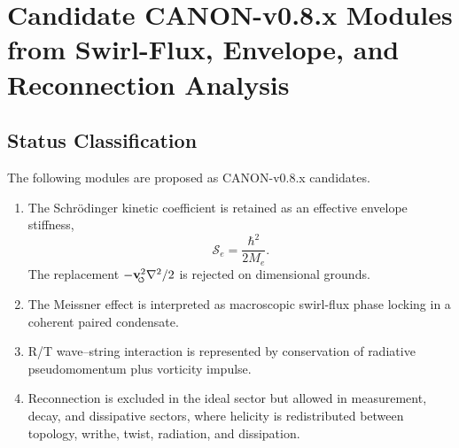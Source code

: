 
\section{Candidate CANON-v0.8.x Modules from Swirl-Flux, Envelope, and Reconnection Analysis}
    \label{app:sst_v08_candidate_modules}

    \providecommand{\swirlarrow}{%
        \mathchoice{\mkern-2mu\scriptstyle\boldsymbol{\circlearrowleft}}%
        {\mkern-2mu\scriptstyle\boldsymbol{\circlearrowleft}}%
        {\mkern-2mu\scriptscriptstyle\boldsymbol{\circlearrowleft}}%
        {\mkern-2mu\scriptscriptstyle\boldsymbol{\circlearrowleft}}%
    }
    \providecommand{\vswirl}{\mathbf{v}_{\!\swirlarrow}}
    \providecommand{\rhoF}{\rho_{\!f}}
    \providecommand{\rhoE}{\rho_{\!E}}
    \providecommand{\rhoM}{\rho_{\!m}}
    \providecommand{\rhocore}{\rho_{\mathrm{core}}}
    \providecommand{\rc}{r_c}
    \providecommand{\Fswirlmax}{F_{\mathrm{swirl}}^{\max}}
    
    \subsection{Status Classification}
        
        The following modules are proposed as CANON-v0.8.x candidates.
        
        \begin{enumerate}
            \item The Schrödinger kinetic coefficient is retained as an effective
            envelope stiffness,
            \[
                \mathcal S_e=\frac{\hbar^2}{2M_e}.
            \]
            The replacement \(-\vswirl^2\nabla^2/2\) is rejected on dimensional grounds.
            
            \item The Meissner effect is interpreted as macroscopic swirl-flux phase
            locking in a coherent paired condensate.
            
            \item R/T wave--string interaction is represented by conservation of
            radiative pseudomomentum plus vorticity impulse.
            
            \item Reconnection is excluded in the ideal sector but allowed in
            measurement, decay, and dissipative sectors, where helicity is redistributed
            between topology, writhe, twist, radiation, and dissipation.
        \end{enumerate}
    
